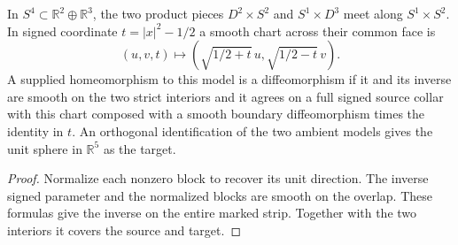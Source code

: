 \begin{proposition}
\label{prop:ed03-smooth-product-seam}
\leanok
In $S^4\subset\mathbb R^2\oplus\mathbb R^3$, the two product pieces
$D^2\times S^2$ and $S^1\times D^3$ meet along $S^1\times S^2$.
In signed coordinate $t=|x|^2-1/2$ a smooth chart across their common
face is
\[
 (u,v,t)\longmapsto (\sqrt{1/2+t}\,u,\sqrt{1/2-t}\,v).
\]
A supplied homeomorphism to this model is a diffeomorphism if it
and its inverse are smooth on the two strict interiors and it agrees
on a full signed source collar with this chart composed with a smooth
boundary diffeomorphism times the identity in $t$. An orthogonal
identification of the two ambient models gives the unit sphere in
$\mathbb R^5$ as the target.
\end{proposition}
\begin{proof}
\leanok
Normalize each nonzero block to recover its unit direction. The
inverse signed parameter and the normalized blocks are smooth on the
overlap. These formulas give the inverse on the entire marked strip.
Together with the two interiors it covers the source and target.
\end{proof}

